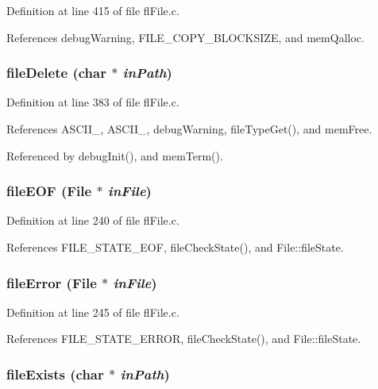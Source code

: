 Definition at line 415 of file fl\-File.c.

References debug\-Warning, FILE\_\-COPY\_\-BLOCKSIZE, and mem\-Qalloc.
\subsubsection{ file\-Delete (char $\ast$ {\em in\-Path})}\label{flFile_8c_c1a484538015c2484789df26ddc797b0}




Definition at line 383 of file fl\-File.c.

References ASCII\_, ASCII\_, debug\-Warning, file\-Type\-Get(), and mem\-Free.

Referenced by debug\-Init(), and mem\-Term().
\subsubsection{ file\-EOF ({\bf File} $\ast$ {\em in\-File})}\label{flFile_8c_19a3ec1ad7d0cd9025f03e79413b2047}




Definition at line 240 of file fl\-File.c.

References FILE\_\-STATE\_\-EOF, file\-Check\-State(), and File::file\-State.
\subsubsection{ file\-Error ({\bf File} $\ast$ {\em in\-File})}\label{flFile_8c_fc8a85a9141393dcf10baa6a2872488a}




Definition at line 245 of file fl\-File.c.

References FILE\_\-STATE\_\-ERROR, file\-Check\-State(), and File::file\-State.
\subsubsection{ file\-Exists (char $\ast$ {\em in\-Path})}\label{flFile_8c_cb13135f9a1ef103656139296d2caf4d}




